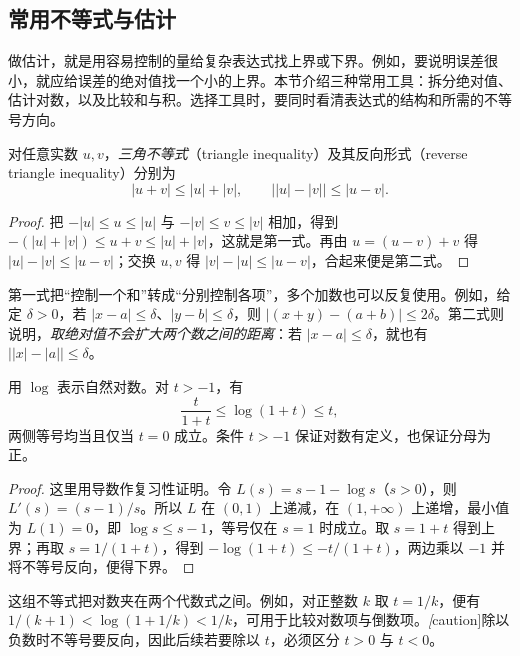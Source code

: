 \subsection{常用不等式与估计}
\label{subsec:pei-basic-inequalities}

做估计，就是用容易控制的量给复杂表达式找上界或下界。例如，要说明误差很小，就应给误差的绝对值找一个小的上界。本节介绍三种常用工具：拆分绝对值、估计对数，以及比较和与积。选择工具时，要同时看清表达式的结构和所需的不等号方向。

\begin{proposition}[三角不等式与反向三角不等式]
\label{prop:pei-triangle-bounds}
对任意实数 $u,v$，\emph{三角不等式}（triangle inequality）及其反向形式（reverse triangle inequality）分别为
\begin{equation}
    |u+v|\le |u|+|v|,\qquad
    \bigl||u|-|v|\bigr|\le |u-v|.
    \label{eq:pei-triangle-bounds}
\end{equation}
\end{proposition}
\begin{proof}
把 $-|u|\le u\le|u|$ 与 $-|v|\le v\le|v|$ 相加，得到 $-(|u|+|v|)\le u+v\le|u|+|v|$，这就是第一式。再由 $u=(u-v)+v$ 得 $|u|-|v|\le|u-v|$；交换 $u,v$ 得 $|v|-|u|\le|u-v|$，合起来便是第二式。
\end{proof}

第一式把“控制一个和”转成“分别控制各项”，多个加数也可以反复使用。例如，给定 $\delta>0$，若 $|x-a|\le\delta$、$|y-b|\le\delta$，则 $|(x+y)-(a+b)|\le2\delta$。第二式则说明，\emph{取绝对值不会扩大两个数之间的距离}：若 $|x-a|\le\delta$，就也有 $\bigl||x|-|a|\bigr|\le\delta$。

\begin{proposition}[对数的上下界]
\label{prop:pei-log-bounds}
用 $\log$ 表示自然对数。对 $t>-1$，有
\begin{equation}
    \frac{t}{1+t}\le\log(1+t)\le t,
    \label{eq:pei-log-bounds}
\end{equation}
两侧等号均当且仅当 $t=0$ 成立。条件 $t>-1$ 保证对数有定义，也保证分母为正。
\end{proposition}
\begin{proof}
这里用导数作复习性证明。令 $L(s)=s-1-\log s$（$s>0$），则 $L'(s)=(s-1)/s$。所以 $L$ 在 $(0,1)$ 上递减，在 $(1,+\infty)$ 上递增，最小值为 $L(1)=0$，即 $\log s\le s-1$，等号仅在 $s=1$ 时成立。取 $s=1+t$ 得到上界；再取 $s=1/(1+t)$，得到 $-\log(1+t)\le-t/(1+t)$，两边乘以 $-1$ 并将不等号反向，便得下界。
\end{proof}

这组不等式把对数夹在两个代数式之间。例如，对正整数 $k$ 取 $t=1/k$，便有 $1/(k+1)<\log(1+1/k)<1/k$，可用于比较对数项与倒数项。\emph[caution]{除以负数时不等号要反向}，因此后续若要除以 $t$，必须区分 $t>0$ 与 $t<0$。

